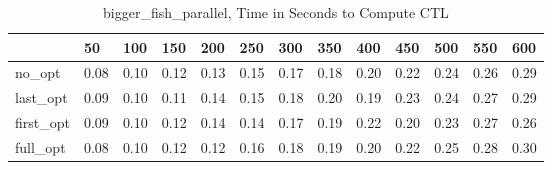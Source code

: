 \begin{table}
\caption{bigger\_fish\_parallel, Time in Seconds to Compute CTL}
\label{bigger_fish_parallel_CTL_time}
\begin{tabular}{lllllllllllll}
\toprule
 & 50 & 100 & 150 & 200 & 250 & 300 & 350 & 400 & 450 & 500 & 550 & 600 \\
\midrule
no\_opt & 0.08 & 0.10 & 0.12 & 0.13 & 0.15 & 0.17 & 0.18 & 0.20 & 0.22 & 0.24 & 0.26 & 0.29 \\
last\_opt & 0.09 & 0.10 & 0.11 & 0.14 & 0.15 & 0.18 & 0.20 & 0.19 & 0.23 & 0.24 & 0.27 & 0.29 \\
first\_opt & 0.09 & 0.10 & 0.12 & 0.14 & 0.14 & 0.17 & 0.19 & 0.22 & 0.20 & 0.23 & 0.27 & 0.26 \\
full\_opt & 0.08 & 0.10 & 0.12 & 0.12 & 0.16 & 0.18 & 0.19 & 0.20 & 0.22 & 0.25 & 0.28 & 0.30 \\
\bottomrule
\end{tabular}
\end{table}
